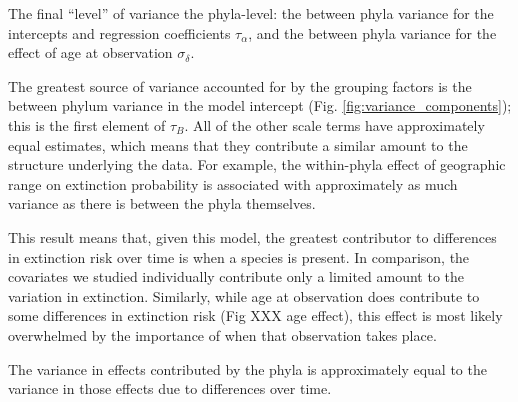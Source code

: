 \documentclass[12pt,letterpaper]{article}
\begin{document}
The final ``level'' of variance the phyla-level: the between phyla variance for the intercepts and regression coefficients \(\tau_{\alpha}\), and the between phyla variance for the effect of age at observation \(\sigma_{\delta}\). 

The greatest source of variance accounted for by the grouping factors is the between phylum variance in the model intercept (Fig. \ref{fig:variance_components}); this is the first element of \(\tau_{B}\). All of the other scale terms have approximately equal estimates, which means that they contribute a similar amount to the structure underlying the data. For example, the within-phyla effect of geographic range on extinction probability is associated with approximately as much variance as there is between the phyla themselves.

This result means that, given this model, the greatest contributor to differences in extinction risk over time is when a species is present. In comparison, the covariates we studied individually contribute only a limited amount to the variation in extinction. Similarly, while age at observation does contribute to some differences in extinction risk (Fig XXX age effect), this effect is most likely overwhelmed by the importance of when that observation takes place.

The variance in effects contributed by the phyla is approximately equal to the variance in those effects due to differences over time.
\end{document}
